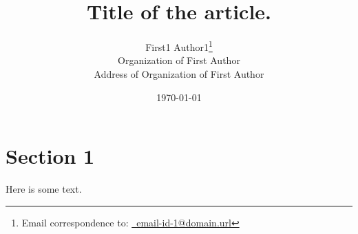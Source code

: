 \documentclass[letter,12pt]{article}
\begin{document}
\title{Title of the article.}
\date{\today}
\author{
	First1 Author1\thanks{Email correspondence to: \href{mailto:email-id-1@domain.url}{\Email\ email-id-1@domain.url}} \\
		Organization of First Author\\
		Address of Organization of First Author
}
\maketitle


\section{Section 1}
\label{sec:mysection1}

Here is some text.


















%
%
%

{\linespread{1}


}
\end{document}
